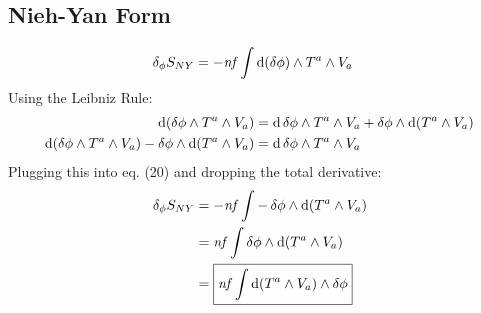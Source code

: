 \documentclass[12pt]{article}
\begin{document}
\subsection{Nieh-Yan Form}
\begin{align}
  \var_\phi{S_{NY}} &= -\mathit{nf} \int \dd(\var{\phi}) \wedge T^a \wedge V_a
\end{align}
Using the Leibniz Rule:
\begin{align*}
  \dd(\var{\phi} \wedge T^a \wedge V_a) &= \dd{\var{\phi}} \wedge T^a \wedge V_a + \var{\phi} \wedge \dd(T^a \wedge V_a) \\
  \dd(\var{\phi} \wedge T^a \wedge V_a) - \var{\phi} \wedge \dd(T^a \wedge V_a) &= \dd{\var{\phi}} \wedge T^a \wedge V_a
\end{align*}
Plugging this into eq. (20) and dropping the total derivative:
\begin{align}
  \var_\phi{S_{NY}} &= -\mathit{nf} \int -\var{\phi} \wedge \dd(T^a \wedge V_a) \nonumber \\
  &= \mathit{nf} \int \var{\phi} \wedge \dd(T^a \wedge V_a) \nonumber \\
  &= \boxed{\mathit{nf} \int \dd(T^a \wedge V_a) \wedge \var{\phi}}
\end{align}
\end{document}
